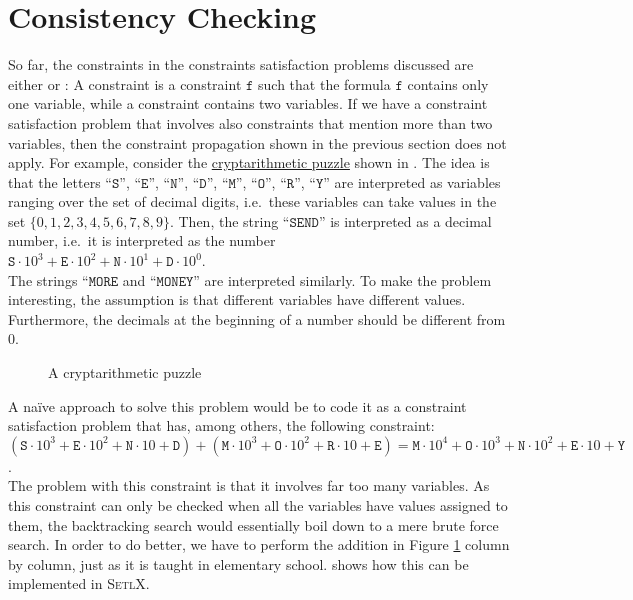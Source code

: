 \section{Consistency Checking}
So far, the constraints in the constraints satisfaction problems discussed are either  
or :  A  constraint is a constraint $\texttt{f}$
such that the formula $\texttt{f}$ contains only one variable, while a  constraint
contains two variables.  If we have a constraint satisfaction problem that involves also constraints that
mention more than two variables, then the constraint propagation shown in the previous section does not apply.
For example, consider the \href{https://en.wikipedia.org/wiki/Verbal_arithmetic}{cryptarithmetic puzzle} shown
in .  The idea is that the letters 
``$\texttt{S}$'', ``$\texttt{E}$'', ``$\texttt{N}$'', ``$\texttt{D}$'', ``$\texttt{M}$'', ``$\texttt{O}$'', ``$\texttt{R}$'', ``$\texttt{Y}$'' 
are interpreted as variables ranging over the set of decimal digits, i.e.~these variables can take values in
the set $\{0,1,2,3,4,5,6,7,8,9\}$.  Then, the string ``$\texttt{SEND}$'' is interpreted as a decimal number,
i.e.~it is interpreted as the number
\\[0.2cm]
\hspace*{1.3cm}
$\texttt{S} \cdot 10^3 + \texttt{E} \cdot 10^2 + \texttt{N} \cdot 10^1 + \texttt{D} \cdot 10^0$.
\\[0.2cm]
The strings ``$\texttt{MORE}$ and ``$\texttt{MONEY}$'' are interpreted similarly. To make the problem
interesting, the assumption is that different variables have different values.  Furthermore, the
decimals at the beginning of a number should be different from $0$.


\begin{figure}[!ht]
\centering
{}

\caption{A cryptarithmetic puzzle}
\label{fig:send-more-money.pdf}
\end{figure}


\noindent
A na\"ive approach to solve this problem would be to code it as a constraint satisfaction problem that has,
among others,  the
following constraint:
\\[0.2cm]
\hspace*{1.3cm}
$   (\texttt{S} \cdot 10^3 + \texttt{E} \cdot 10^2 + \texttt{N} \cdot 10 + \texttt{D}) 
  + (\texttt{M} \cdot 10^3 + \texttt{O} \cdot 10^2 + \texttt{R} \cdot 10 + \texttt{E})
  = \texttt{M} \cdot 10^4 + \texttt{O} \cdot 10^3 + \texttt{N} \cdot 10^2 + \texttt{E} \cdot 10 + \texttt{Y}
$.
\\[0.2cm]
 The problem with this constraint is that it involves far too many variables.  As this constraint can only be
 checked when all the variables have values assigned to them, the backtracking search would essentially
 boil down to a mere brute force search.  In order to do better, we have to perform the addition in Figure
 \ref{fig:send-more-money.pdf} column by column, just as it is taught in elementary school.
  shows how this can be implemented in \textsc{SetlX}.

